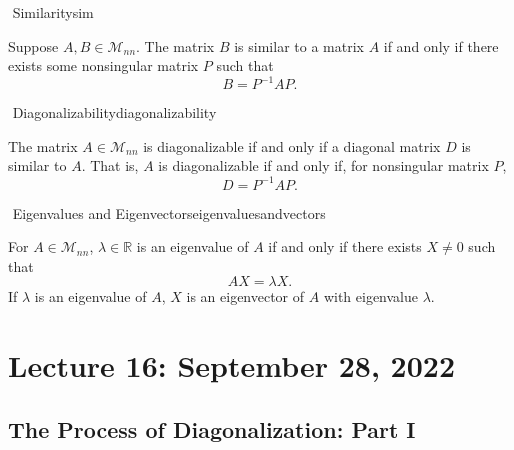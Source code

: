         \begin{definition}{\Stop\,\,Similarity}{sim}

            Suppose \(A,B\in\mathcal{M}_{nn}\). The matrix \(B\) is similar to a matrix \(A\) if and only if there exists some nonsingular matrix \(P\) such that
            \begin{equation*}
                B=P^{-1}AP.
            \end{equation*}

        \end{definition}
        \begin{definition}{\Stop\,\,Diagonalizability}{diagonalizability}

            The matrix \(A\in\mathcal{M}_{nn}\) is diagonalizable if and only if a diagonal matrix \(D\) is similar to \(A\). That is, \(A\) is diagonalizable if and only if, for nonsingular matrix \(P\),
            \begin{equation*}
                D=P^{-1}AP.
            \end{equation*}
            
        \end{definition}
        \begin{definition}{\Stop\,\,Eigenvalues and Eigenvectors}{eigenvaluesandvectors}

            For \(A\in\mathcal{M}_{nn}\), \(\lambda\in\mathbb{R}\) is an eigenvalue of \(A\) if and only if there exists \(X\neq0\) such that
            \begin{equation*}
                AX=\lambda X.
            \end{equation*}
            If \(\lambda\) is an eigenvalue of \(A\), \(X\) is an eigenvector of \(A\) with eigenvalue \(\lambda\).

        \end{definition}

        \pagebreak

\section{Lecture 16: September 28, 2022}

    \subsection{The Process of Diagonalization: Part I}

